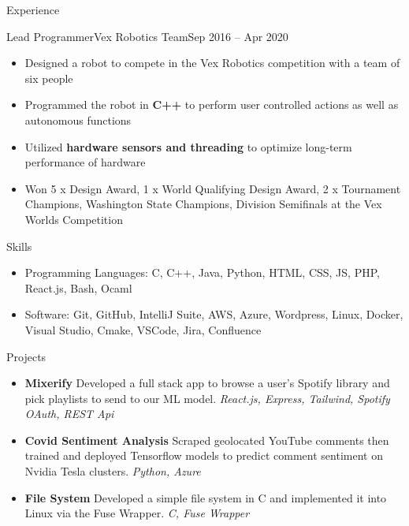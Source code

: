 \documentclass[]{mcdowellcv}
\begin{document}
\begin{cvsection}{Experience}
\begin{cvsubsection}{Lead Programmer}{Vex Robotics Team}{Sep 2016 -- Apr 2020}
\begin{itemize}
			\item Designed a robot to compete in the Vex Robotics competition with a team of six people
			\item Programmed the robot in \textbf{C++} to perform user controlled actions as well as autonomous functions
			\item Utilized \textbf{hardware sensors and threading} to optimize long-term performance of hardware
			\item Won 5 x Design Award, 1 x World Qualifying Design Award, 2 x Tournament Champions, Washington State Champions, Division Semifinals at the Vex Worlds Competition
		\end{itemize}
	\end{cvsubsection}
\end{cvsection}
\begin{cvsection}{Skills}
	\begin{cvsubsection}{}{}{}
		\begin{itemize}
			\item Programming Languages:  C, C++, Java, Python, HTML, CSS, JS, PHP, React.js, Bash, Ocaml
			\item Software:  Git, GitHub, IntelliJ Suite, AWS, Azure, Wordpress, Linux, Docker, Visual Studio, Cmake, VSCode, Jira, Confluence
		\end{itemize}
	\end{cvsubsection}
\end{cvsection}
\begin{cvsection}{Projects}
	\begin{cvsubsection}{}{}{}
		\begin{itemize}
			\setlength\itemsep{3pt}
			\item \textbf{Mixerify} Developed a full stack app to browse a user's Spotify library and pick playlists to send to our ML model. \textit{React.js, Express, Tailwind, Spotify OAuth, REST Api}
			\item \textbf{Covid Sentiment Analysis}  Scraped geolocated YouTube comments then trained and deployed Tensorflow models to predict comment sentiment on Nvidia Tesla clusters. \textit{Python, Azure}
			\item \textbf{File System}  Developed a simple file system in C and implemented it into Linux via the Fuse Wrapper. \textit{C, Fuse Wrapper}
		\end{itemize}
	\end{cvsubsection}
\end{cvsection}
\end{document}
